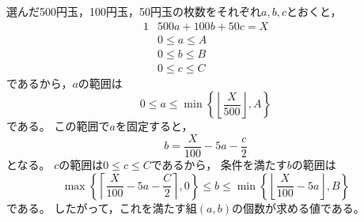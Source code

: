 \documentclass{article}
\newcommand{\myfloor}[1]{\left\lfloor {#1} \right\rfloor}
\newcommand{\myceil}[1]{\left\lceil {#1} \right\rceil}
\begin{document}
選んだ500円玉，100円玉，50円玉の枚数をそれぞれ$a, b, c$とおくと，
\begin{alignat}{1}
    & 500a + 100b + 50c = X \\
    & 0 \leq a \leq A \\
    & 0 \leq b \leq B \\
    & 0 \leq c \leq C
\end{alignat}
であるから，$a$の範囲は
\begin{equation}
    0 \leq a \leq \min \left\{ \myfloor{\dfrac{X}{500}}, A \right\}
\end{equation}
である。
この範囲で$a$を固定すると，
\begin{equation}
    b = \dfrac{X}{100} - 5a - \dfrac{c}{2}
\end{equation}
となる。
$c$の範囲は$0 \leq c \leq C$であるから，
条件を満たす$b$の範囲は
\begin{equation}
    \max \left\{ \myceil{\dfrac{X}{100} - 5a - \dfrac{C}{2}}, 0 \right\}
    \leq b \leq
    \min \left\{ \myfloor{\dfrac{X}{100} - 5a}, B \right\}
\end{equation}
である。
したがって，これを満たす組$(a, b)$の個数が求める値である。
\end{document}
